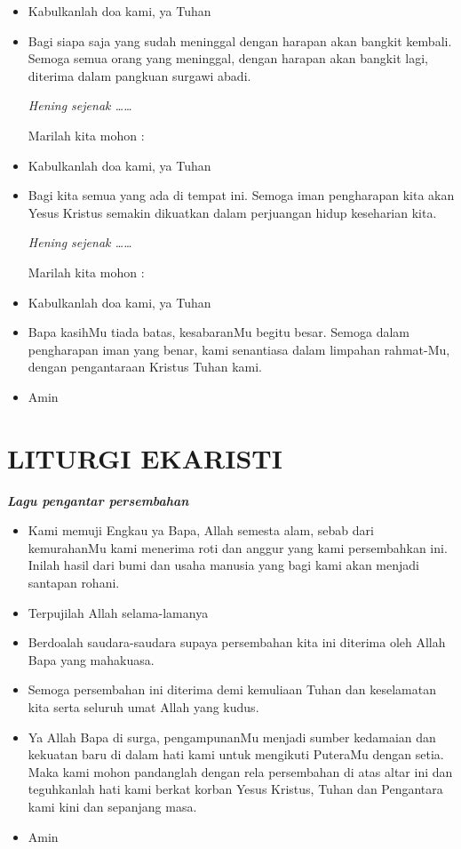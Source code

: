 \documentclass[titlepage,10pt,openany]{scrbook}
\makeatletter
\newcommand{\lagu}[1]{%
  {\parindent \z@ 
    \interlinepenalty\@M \slshape \bfseries \normalsize \textit{#1}\par\nobreak \vskip 10\p@ }}
\newcommand{\BU}[1]{\begin{itemize} \item[U:] #1 \end{itemize}}
\newcommand{\BI}[1]{\begin{itemize} \item[I:] #1 \end{itemize}}
\newcommand{\BP}[1]{\begin{itemize} \item[P:] #1 \end{itemize}}
\makeatother
\begin{document}
\BU{Kabulkanlah doa kami, ya Tuhan}

\BP{Bagi siapa saja yang sudah meninggal dengan harapan akan bangkit kembali. Semoga semua orang yang meninggal, dengan harapan akan bangkit lagi, diterima dalam pangkuan surgawi abadi.

\textit{Hening sejenak \ldots\ldots} 

Marilah kita mohon :}

\BU{Kabulkanlah doa kami, ya Tuhan}

\BP{Bagi kita semua yang ada di tempat ini.
Semoga iman pengharapan kita akan Yesus Kristus
semakin dikuatkan dalam perjuangan hidup keseharian
kita.

\textit{Hening sejenak \ldots\ldots} 

Marilah kita mohon :}

\BU{Kabulkanlah doa kami, ya Tuhan}

\BI{Bapa kasihMu tiada batas, kesabaranMu begitu besar. Semoga dalam pengharapan iman yang benar, kami senantiasa dalam limpahan rahmat-Mu, dengan pengantaraan Kristus Tuhan kami.}

\BU{Amin}

\section*{LITURGI EKARISTI}

\lagu{Lagu pengantar persembahan}


\BI{Kami memuji Engkau ya Bapa, Allah semesta alam, sebab 
dari kemurahanMu kami menerima roti dan anggur yang 
kami persembahkan ini. Inilah hasil dari bumi dan usaha 
manusia yang bagi kami akan menjadi santapan rohani.}

\BU{Terpujilah Allah selama-lamanya}

\BI{Berdoalah saudara-saudara supaya persembahan kita ini 
diterima oleh Allah Bapa yang mahakuasa.}

\BU{Semoga persembahan ini diterima demi kemuliaan Tuhan 
dan keselamatan kita serta seluruh umat Allah yang kudus.}

\BI{Ya Allah Bapa di surga, pengampunanMu menjadi sumber 
kedamaian dan kekuatan baru di dalam hati kami untuk 
mengikuti PuteraMu dengan setia. Maka kami mohon 
pandanglah dengan rela persembahan di atas altar ini dan 
teguhkanlah hati kami berkat korban Yesus Kristus, Tuhan 
dan Pengantara kami kini dan sepanjang masa.}

\BU{Amin} 
\end{document}
